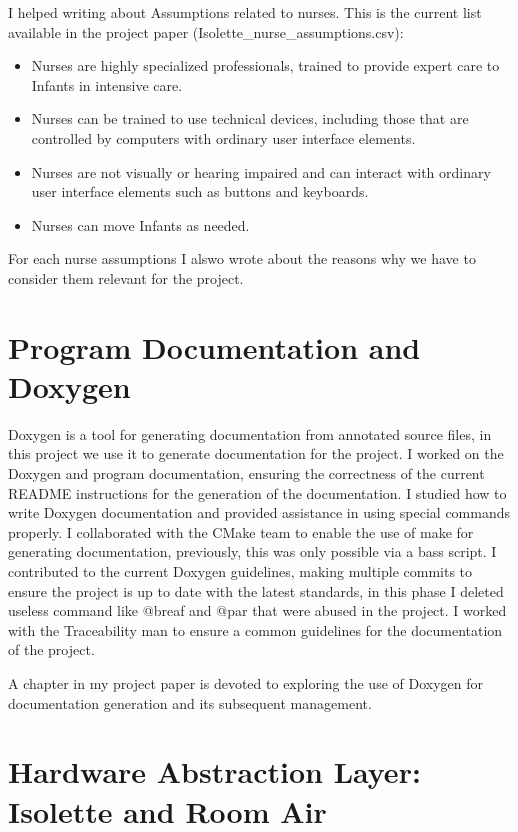 \documentclass[a4paper, 12pt]{article}
\begin{document}
I helped writing about Assumptions related to nurses. 
This is the current list available in the project paper (Isolette\_nurse\_assumptions.csv):

\begin{itemize}
    \item Nurses are highly specialized professionals, trained to provide expert care to Infants in intensive care.
    \item Nurses can be trained to use technical devices, including those that are controlled by computers with ordinary user interface elements.
    \item Nurses are not visually or hearing impaired and can interact with ordinary user interface elements such as buttons and keyboards.
    \item Nurses can move Infants as needed.
\end{itemize}

For each nurse assumptions I alswo wrote about the reasons why we have to consider them relevant for the project.

\section{Program Documentation and Doxygen}

Doxygen is a tool for generating documentation from annotated source files, in this project we use it to generate documentation for the project.
I worked on the Doxygen and program documentation, ensuring the correctness of the current README instructions for the generation of the documentation.
I studied how to write Doxygen documentation and provided assistance in using special commands properly.
I collaborated with the CMake team to enable the use of make for generating documentation, previously, this was only possible via a bass script. 
I contributed to the current Doxygen guidelines, making multiple commits to ensure the project is up to date with the latest standards, 
in this phase I deleted useless command like @breaf and @par that were abused in the project.
I worked with the Traceability man to ensure a common guidelines for the documentation of the project.

A chapter in my project paper is devoted to exploring the use of Doxygen for documentation generation and its subsequent management.

\section{Hardware Abstraction Layer: Isolette and Room Air}
\end{document}
